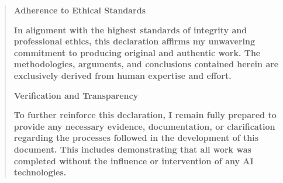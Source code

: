 \documentclass[12pt,a4paper]{article}
\renewenvironment{quote}{\begin{quotation}}{\end{quotation}}  %
\begin{document}
\begin{quote}
    \textbf{Adherence to Ethical Standards}
    
    \textbf{In alignment with the highest standards of integrity and
    professional ethics, this declaration affirms my unwavering commitment
    to producing original and authentic work. The methodologies, arguments,
    and conclusions contained herein are exclusively derived from human
    expertise and effort.}
    
    \textbf{Verification and Transparency}
    
    \textbf{To further reinforce this declaration, I remain fully prepared
    to provide any necessary evidence, documentation, or clarification
    regarding the processes followed in the development of this document.
    This includes demonstrating that all work was completed without the
    influence or intervention of any AI technologies.}
    \end{quote}
    



\end{document}

